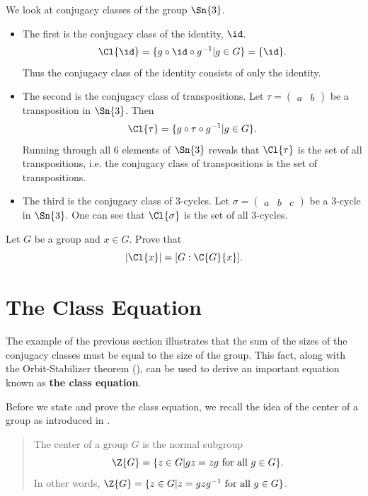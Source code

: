 \begin{example}\label{example-conjugacy-classes-of-Sn3}
    We look at conjugacy classes of the group $\Sn{3}$.
    \begin{itemize}
        \item The first is the conjugacy class of the identity, $\id$.
        \[
            \Cl{\id} = \{g\circ\id\circ g^{-1} \vert g \in G \} = \{\id\}.
        \]
        Thus the conjugacy class of the identity consists of only the identity.
        \item The second is the conjugacy class of transpositions. Let $\tau = \begin{pmatrix}a & b\end{pmatrix}$ be a transposition in $\Sn{3}$. Then
        \[
            \Cl{\tau} = \{g\circ\tau\circ g^{-1} \vert g \in G\}.
        \]
        Running through all 6 elements of $\Sn{3}$ reveals that $\Cl{\tau}$ is the set of all transpositions, i.e. the conjugacy class of transpositions is the set of transpositions.
        \item The third is the conjugacy class of 3-cycles. Let $\sigma = \begin{pmatrix}a & b & c\end{pmatrix}$ be a 3-cycle in $\Sn{3}$. One can see that $\Cl{\sigma}$ is the set of all 3-cycles.
    \end{itemize}
\end{example}

\begin{exercise}\label{exercise-order-of-conjugacy-class}
    Let $G$ be a group and $x \in G$. Prove that
    \[
        |\Cl{x}| = [G : \C{G}{x}].
    \]
\end{exercise}

\section{The Class Equation}
The example of the previous section illustrates that the sum of the sizes of the conjugacy classes must be equal to the size of the group. This fact, along with the Orbit-Stabilizer theorem (), can be used to derive an important equation known as \textbf{the class equation}.

Before we state and prove the class equation, we recall the idea of the center of a group as introduced in .
\begin{quote}
    The center of a group $G$ is the normal subgroup
    \[
        \Z{G} = \{z \in G \vert gz = zg \text{ for all } g \in G\}.
    \]
    In other words, $\Z{G} = \{z \in G \vert z = gzg^{-1} \text{ for all } g \in G\}$.
\end{quote}


